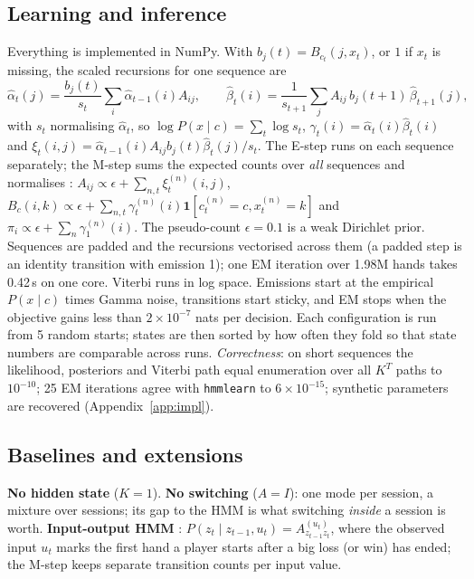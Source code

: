 \subsection{Learning and inference}
Everything is implemented in NumPy. With $b_j(t)=B_{c_t}(j,x_t)$, or $1$ if $x_t$ is missing, the scaled recursions for one sequence are
\begin{equation}
\hat\alpha_t(j)=\frac{b_j(t)}{s_t}\sum_i\hat\alpha_{t-1}(i)A_{ij},\qquad
\hat\beta_t(i)=\frac{1}{s_{t+1}}\sum_jA_{ij}\,b_j(t+1)\,\hat\beta_{t+1}(j),
\end{equation}
with $s_t$ normalising $\hat\alpha_t$, so $\log P(x\mid c)=\sum_t\log s_t$, $\gamma_t(i)=\hat\alpha_t(i)\hat\beta_t(i)$ and $\xi_t(i,j)=\hat\alpha_{t-1}(i)A_{ij}b_j(t)\hat\beta_t(j)/s_t$. The E-step runs on each sequence separately; the M-step sums the expected counts over \emph{all} sequences and normalises \cite{rabiner1989}: $A_{ij}\propto\epsilon+\sum_{n,t}\xi^{(n)}_t(i,j)$, $B_c(i,k)\propto\epsilon+\sum_{n,t}\gamma^{(n)}_t(i)\mathbf 1[c^{(n)}_t=c,x^{(n)}_t=k]$ and $\pi_i\propto\epsilon+\sum_n\gamma^{(n)}_1(i)$.
The pseudo-count $\epsilon=0.1$ is a weak Dirichlet prior. Sequences are padded and the recursions vectorised across them (a padded step is an identity transition with emission 1); one EM iteration over 1.98M hands takes 0.42\,s on one core. Viterbi runs in log space. Emissions start at the empirical $P(x\mid c)$ times Gamma noise, transitions start sticky, and EM stops when the objective gains less than $2\times10^{-7}$ nats per decision. Each configuration is run from 5 random starts; states are then sorted by how often they fold so that state numbers are comparable across runs. \emph{Correctness}: on short sequences the likelihood, posteriors and Viterbi path equal enumeration over all $K^T$ paths to $10^{-10}$; 25 EM iterations agree with \texttt{hmmlearn} \cite{hmmlearn} to $6\times10^{-15}$; synthetic parameters are recovered (Appendix~\ref{app:impl}).

\subsection{Baselines and extensions}
\label{sec:personal}
\textbf{No hidden state} ($K=1$). \textbf{No switching} ($A=I$): one mode per session, a mixture over sessions; its gap to the HMM is what switching \emph{inside} a session is worth. \textbf{Input-output HMM} \cite{bengio1995}: $P(z_t\mid z_{t-1},u_t)=A^{(u_t)}_{z_{t-1}z_t}$, where the observed input $u_t$ marks the first hand a player starts after a big loss (or win) has ended; the M-step keeps separate transition counts per input value.


